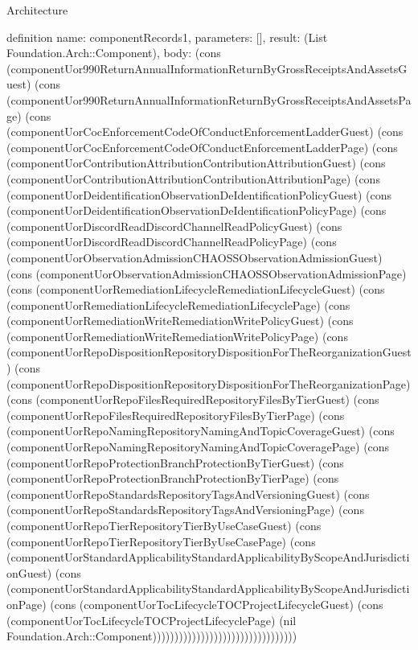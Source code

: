 \begin{lexlean}{Architecture}
\begin{semanticmodule}
definition{
  name: componentRecords1,
  parameters: [],
  result: (List Foundation.Arch::Component),
  body: (cons (componentUor990ReturnAnnualInformationReturnByGrossReceiptsAndAssetsGuest) (cons (componentUor990ReturnAnnualInformationReturnByGrossReceiptsAndAssetsPage) (cons (componentUorCocEnforcementCodeOfConductEnforcementLadderGuest) (cons (componentUorCocEnforcementCodeOfConductEnforcementLadderPage) (cons (componentUorContributionAttributionContributionAttributionGuest) (cons (componentUorContributionAttributionContributionAttributionPage) (cons (componentUorDeidentificationObservationDeIdentificationPolicyGuest) (cons (componentUorDeidentificationObservationDeIdentificationPolicyPage) (cons (componentUorDiscordReadDiscordChannelReadPolicyGuest) (cons (componentUorDiscordReadDiscordChannelReadPolicyPage) (cons (componentUorObservationAdmissionCHAOSSObservationAdmissionGuest) (cons (componentUorObservationAdmissionCHAOSSObservationAdmissionPage) (cons (componentUorRemediationLifecycleRemediationLifecycleGuest) (cons (componentUorRemediationLifecycleRemediationLifecyclePage) (cons (componentUorRemediationWriteRemediationWritePolicyGuest) (cons (componentUorRemediationWriteRemediationWritePolicyPage) (cons (componentUorRepoDispositionRepositoryDispositionForTheReorganizationGuest) (cons (componentUorRepoDispositionRepositoryDispositionForTheReorganizationPage) (cons (componentUorRepoFilesRequiredRepositoryFilesByTierGuest) (cons (componentUorRepoFilesRequiredRepositoryFilesByTierPage) (cons (componentUorRepoNamingRepositoryNamingAndTopicCoverageGuest) (cons (componentUorRepoNamingRepositoryNamingAndTopicCoveragePage) (cons (componentUorRepoProtectionBranchProtectionByTierGuest) (cons (componentUorRepoProtectionBranchProtectionByTierPage) (cons (componentUorRepoStandardsRepositoryTagsAndVersioningGuest) (cons (componentUorRepoStandardsRepositoryTagsAndVersioningPage) (cons (componentUorRepoTierRepositoryTierByUseCaseGuest) (cons (componentUorRepoTierRepositoryTierByUseCasePage) (cons (componentUorStandardApplicabilityStandardApplicabilityByScopeAndJurisdictionGuest) (cons (componentUorStandardApplicabilityStandardApplicabilityByScopeAndJurisdictionPage) (cons (componentUorTocLifecycleTOCProjectLifecycleGuest) (cons (componentUorTocLifecycleTOCProjectLifecyclePage) (nil Foundation.Arch::Component)))))))))))))))))))))))))))))))))
}


\end{semanticmodule}
\end{lexlean}
